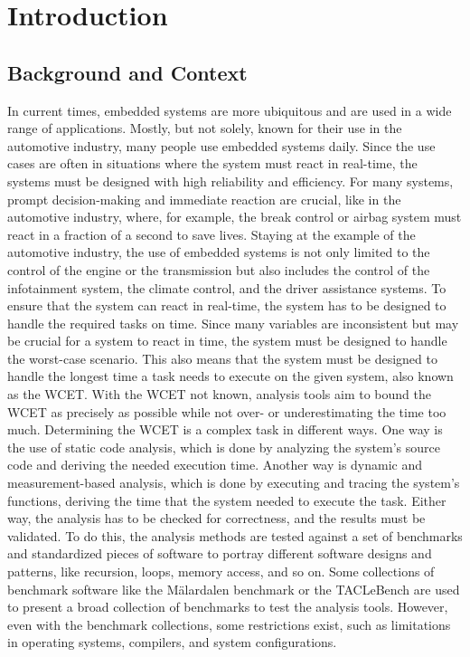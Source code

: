 \chapter{Introduction}\label{ch:introduction}
\section{Background and Context}\label{sec:background}
In current times, embedded systems are more ubiquitous and are used in a wide range of applications. 
Mostly, but not solely, known for their use in the automotive industry, many people use embedded systems daily.
Since the use cases are often in situations where the system must react in real-time, the systems must be designed with high reliability and efficiency.
For many systems, prompt decision-making and immediate reaction are crucial, like in the automotive industry, where, for example, the break control or airbag system must react in a fraction of a second to save lives. 
Staying at the example of the automotive industry, the use of embedded systems is not only limited to the control of the engine or the transmission but also includes the control of the infotainment system, the climate control, and the driver assistance systems.
To ensure that the system can react in real-time, the system has to be designed to handle the required tasks on time.
Since many variables are inconsistent but may be crucial for a system to react in time, the system must be designed to handle the worst-case scenario.
This also means that the system must be designed to handle the longest time a task needs to execute on the given system, also known as the \ac{WCET}.
With the \ac{WCET} not known, analysis tools aim to bound the \ac{WCET} as precisely as possible while not over- or underestimating the time too much.
Determining the \ac{WCET} is a complex task in different ways.
One way is the use of static code analysis, which is done by analyzing the system's source code and deriving the needed execution time\cite{buttazzoHardRealTimeComputing2024}.
Another way is dynamic and measurement-based analysis, which is done by executing and tracing the system's functions, deriving the time that the system needed to execute the task\cite{buttazzoHardRealTimeComputing2024}.
Either way, the analysis has to be checked for correctness, and the results must be validated.
To do this, the analysis methods are tested against a set of benchmarks and standardized pieces of software to portray different software designs and patterns, like recursion, loops, memory access, and so on.
Some collections of benchmark software like the Mälardalen benchmark\cite{gustafssonMalardalenWCETBenchmarks2012} or the TACLeBench\cite{falkTACLeBenchBenchmarkCollection2016} are used to present a broad collection of benchmarks to test the analysis tools.
However, even with the benchmark collections, some restrictions exist, such as limitations in operating systems, compilers, and system configurations.\cite{falkTACLeBenchBenchmarkCollection2016,gustafssonMalardalenWCETBenchmarks2012}

